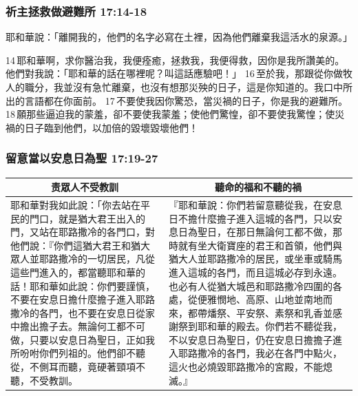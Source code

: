 \subsubsection{祈主拯救做避難所 17:14-18}


耶和華說：「離開我的，他們的名字必寫在土裡，因為他們離棄我這活水的泉源。」 

14 耶和華啊，求你醫治我，我便痊癒，拯救我，我便得救，因你是我所讚美的。
他們對我說：「耶和華的話在哪裡呢？叫這話應驗吧！」 16 至於我，那跟從你做牧人的職分，我並沒有急忙離棄，也沒有想那災殃的日子，這是你知道的。我口中所出的言語都在你面前。 17 不要使我因你驚恐，當災禍的日子，你是我的避難所。 18 願那些逼迫我的蒙羞，卻不要使我蒙羞；使他們驚惶，卻不要使我驚惶；使災禍的日子臨到他們，以加倍的毀壞毀壞他們！

\subsubsection{留意當以安息日為聖 17:19-27}
\begin{table}[H]
\centering
\begin{tabular}{p{7.75cm}|p{9.50cm}}\hline\hline
\multicolumn{1}{c|}{责眾人不受教訓}&\multicolumn{1}{c}{聽命的福和不聽的禍}\\\hline
耶和華對我如此說：「你去站在平民的門口，就是猶大君王出入的門，又站在耶路撒冷的各門口，對他們說：『你們這猶大君王和猶大眾人並耶路撒冷的一切居民，凡從這些門進入的，都當聽耶和華的話！耶和華如此說：你們要謹慎，不要在安息日擔什麼擔子進入耶路撒冷的各門，也不要在安息日從家中擔出擔子去。無論何工都不可做，只要以安息日為聖日，正如我所吩咐你們列祖的。他們卻不聽從，不側耳而聽，竟硬著頸項不聽，不受教訓。
&『耶和華說：你們若留意聽從我，在安息日不擔什麼擔子進入這城的各門，只以安息日為聖日，在那日無論何工都不做，那時就有坐大衛寶座的君王和首領，他們與猶大人並耶路撒冷的居民，或坐車或騎馬進入這城的各門，而且這城必存到永遠。也必有人從猶大城邑和耶路撒冷四圍的各處，從便雅憫地、高原、山地並南地而來，都帶燔祭、平安祭、素祭和乳香並感謝祭到耶和華的殿去。你們若不聽從我，不以安息日為聖日，仍在安息日擔擔子進入耶路撒冷的各門，我必在各門中點火，這火也必燒毀耶路撒冷的宮殿，不能熄滅。』\\\hline
\end{tabular}
\end{table}


